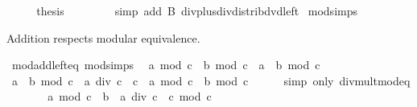 \begin{isabellebody}
\ \ \isamarkupfalse%
\ \isamarkupfalse%
\ {\isacharquery}{\kern0pt}thesis\ \isamarkupfalse%
\ {\isacharasterisk}{\kern0pt}\isanewline
\ \ \ \ \isamarkupfalse%
\ {\isacharparenleft}{\kern0pt}simp\ add{\isacharcolon}{\kern0pt}\ B\ div{\isacharunderscore}{\kern0pt}plus{\isacharunderscore}{\kern0pt}div{\isacharunderscore}{\kern0pt}distrib{\isacharunderscore}{\kern0pt}dvd{\isacharunderscore}{\kern0pt}left{\isacharparenright}{\kern0pt}\isanewline
{}\isamarkupfalse%
%
\endisatagproof
{\isafoldproof}%
%
\isadelimproof
\isanewline
%
\endisadelimproof
\isanewline
{}\isamarkupfalse%
\ mod{\isacharunderscore}{\kern0pt}simps%
\begin{isamarkuptext}%
Addition respects modular equivalence.%
\end{isamarkuptext}\isamarkuptrue%
\isamarkupfalse%
\ mod{\isacharunderscore}{\kern0pt}add{\isacharunderscore}{\kern0pt}left{\isacharunderscore}{\kern0pt}eq\ {\isacharbrackleft}{\kern0pt}mod{\isacharunderscore}{\kern0pt}simps{\isacharbrackright}{\kern0pt}{\isacharcolon}{\kern0pt}\isanewline
\ \ {\isachardoublequoteopen}{\isacharparenleft}{\kern0pt}a\ mod\ c\ {\isacharplus}{\kern0pt}\ b{\isacharparenright}{\kern0pt}\ mod\ c\ {\isacharequal}{\kern0pt}\ {\isacharparenleft}{\kern0pt}a\ {\isacharplus}{\kern0pt}\ b{\isacharparenright}{\kern0pt}\ mod\ c{\isachardoublequoteclose}\isanewline
%
\isadelimproof
%
\endisadelimproof
%
\isatagproof
{}\isamarkupfalse%
\ {\isacharminus}{\kern0pt}\isanewline
\ \ \isamarkupfalse%
\ {\isachardoublequoteopen}{\isacharparenleft}{\kern0pt}a\ {\isacharplus}{\kern0pt}\ b{\isacharparenright}{\kern0pt}\ mod\ c\ {\isacharequal}{\kern0pt}\ {\isacharparenleft}{\kern0pt}a\ div\ c\ {\isacharasterisk}{\kern0pt}\ c\ {\isacharplus}{\kern0pt}\ a\ mod\ c\ {\isacharplus}{\kern0pt}\ b{\isacharparenright}{\kern0pt}\ mod\ c{\isachardoublequoteclose}\isanewline
\ \ \ \ \isamarkupfalse%
\ {\isacharparenleft}{\kern0pt}simp\ only{\isacharcolon}{\kern0pt}\ div{\isacharunderscore}{\kern0pt}mult{\isacharunderscore}{\kern0pt}mod{\isacharunderscore}{\kern0pt}eq{\isacharparenright}{\kern0pt}\isanewline
\ \ \isamarkupfalse%
\ \isamarkupfalse%
\ {\isachardoublequoteopen}{\isasymdots}\ {\isacharequal}{\kern0pt}\ {\isacharparenleft}{\kern0pt}a\ mod\ c\ {\isacharplus}{\kern0pt}\ b\ {\isacharplus}{\kern0pt}\ a\ div\ c\ {\isacharasterisk}{\kern0pt}\ c{\isacharparenright}{\kern0pt}\ mod\ c{\isachardoublequoteclose}\isanewline

\end{isabellebody}
